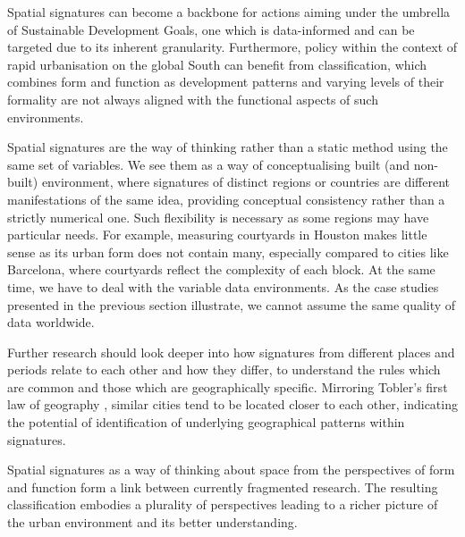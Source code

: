 Spatial signatures can become a backbone for actions aiming under the umbrella of
Sustainable Development Goals, one which is data-informed and can be targeted due to its
inherent granularity. Furthermore, policy within the context of rapid urbanisation on
the global South can benefit from classification, which combines form and function as
development patterns and varying levels of their formality are not always aligned with
the functional aspects of such environments.

Spatial signatures are the way of thinking rather than a static method using the same
set of variables. We see them as a way of conceptualising built (and non-built)
environment, where signatures of distinct regions or countries are different
manifestations of the same idea, providing conceptual consistency rather than a strictly
numerical one. Such flexibility is necessary as some regions may have particular
needs. For example, measuring courtyards in Houston makes little sense as its urban
form does not contain many, especially compared to cities like Barcelona, where
courtyards reflect the complexity of each block. At the same time, we have to deal with
the variable data environments. As the case studies presented in the previous section
illustrate, we cannot assume the same quality of data worldwide.

Further research should look deeper into how signatures from different places and
periods relate to each other and how they differ, to understand the rules which are
common and those which are geographically specific. Mirroring Tobler's first law of
geography \citep{tobler1970computer}, similar cities tend to be located closer to each
other, indicating the potential of identification of underlying geographical patterns
within signatures.

Spatial signatures as a way of thinking about space from the perspectives of form and
function form a link between currently fragmented research. The resulting
classification embodies a plurality of perspectives leading to a richer picture of the
urban environment and its better understanding.

